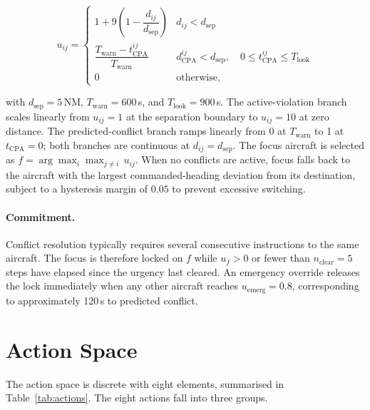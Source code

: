 \documentclass[11pt, a4paper]{article}
\begin{document}
\begin{equation}
u_{ij} =
\begin{cases}
1 + 9\!\left(1 - \dfrac{d_{ij}}{d_\text{sep}}\right)
  & d_{ij} < d_\text{sep} \\[8pt]
\dfrac{T_\text{warn} - t_\text{CPA}^{ij}}{T_\text{warn}}
  & d_\text{CPA}^{ij} < d_\text{sep},\quad
    0 \leq t_\text{CPA}^{ij} \leq T_\text{look} \\[6pt]
0 & \text{otherwise,}
\end{cases}
\label{eq:urgency}
\end{equation}

with $d_\text{sep} = 5$\,NM, $T_\text{warn} = 600$\,s, and
$T_\text{look} = 900$\,s.
The active-violation branch scales linearly from $u_{ij} = 1$ at the
separation boundary to $u_{ij} = 10$ at zero distance.
The predicted-conflict branch ramps linearly from 0 at $T_\text{warn}$ to 1
at $t_\text{CPA} = 0$; both branches are continuous at $d_{ij} = d_\text{sep}$.
The focus aircraft is selected as $f = \arg\max_i \max_{j \neq i}\, u_{ij}$.
When no conflicts are active, focus falls back to the aircraft with the
largest commanded-heading deviation from its destination, subject to a
hysteresis margin of $0.05$ to prevent excessive switching.

\paragraph{Commitment.}
Conflict resolution typically requires several consecutive instructions
to the same aircraft.
The focus is therefore locked on $f$ while $u_f > 0$ or fewer than
$n_\text{clear} = 5$ steps have elapsed since the urgency last cleared.
An emergency override releases the lock immediately when any other aircraft
reaches $u_\text{emerg} = 0.8$, corresponding to approximately 120\,s
to predicted conflict.

\section{Action Space}
\label{sec:actions}

The action space is discrete with eight elements, summarised in
Table~\ref{tab:actions}.
The eight actions fall into three groups.
\end{document}
